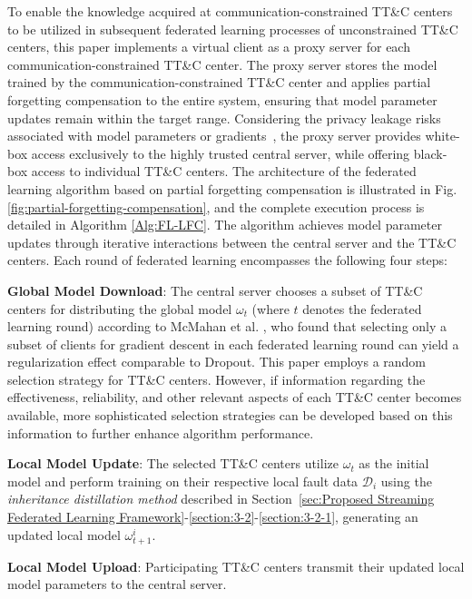 To enable the knowledge acquired at communication-constrained TT\&C centers 
to be utilized in subsequent federated learning processes of unconstrained TT\&C centers, 
this paper implements a virtual client as a proxy server for each communication-constrained TT\&C center. 
The proxy server stores the model trained by the communication-constrained TT\&C center 
and applies partial forgetting compensation to the entire system, 
ensuring that model parameter updates remain within the target range.
Considering the privacy leakage risks associated with model parameters or gradients~\cite{hitaj2017deep}, 
the proxy server provides white-box access exclusively to the highly trusted central server, 
while offering black-box access to individual TT\&C centers. 
The architecture of the federated learning algorithm based on partial forgetting compensation is illustrated in Fig. \ref{fig:partial-forgetting-compensation},
and the complete execution process is detailed in Algorithm \ref{Alg:FL-LFC}. 
The algorithm achieves model parameter updates through iterative interactions between the central server and the TT\&C centers. 
Each round of federated learning encompasses the following four steps:

\textbf{Global Model Download}: The central server chooses a subset of TT\&C centers for distributing the global model $\omega_t$ 
(where $t$ denotes the federated learning round) 
according to McMahan et al. \cite{mcmahan2017communication}, who found that selecting only a subset of clients for gradient descent 
in each federated learning round can yield a regularization effect comparable to Dropout. 
This paper employs a random selection strategy for TT\&C centers. 
However, if information regarding the effectiveness, reliability, and other relevant aspects of each TT\&C center becomes available, 
more sophisticated selection strategies can be developed based on this information to further enhance algorithm performance.

\textbf{Local Model Update}: The selected TT\&C centers utilize ${\omega _t}$ as the initial model and perform training 
on their respective local fault data ${{\mathscr D}_{i}}$ using the \textit{inheritance distillation method} 
described in Section~\ref{sec:Proposed Streaming Federated Learning Framework}-\ref{section:3-2}-\ref{section:3-2-1}, generating an updated local model $\omega _{t + 1}^i$.

\textbf{Local Model Upload}: Participating TT\&C centers transmit their updated local model parameters to the central server.

